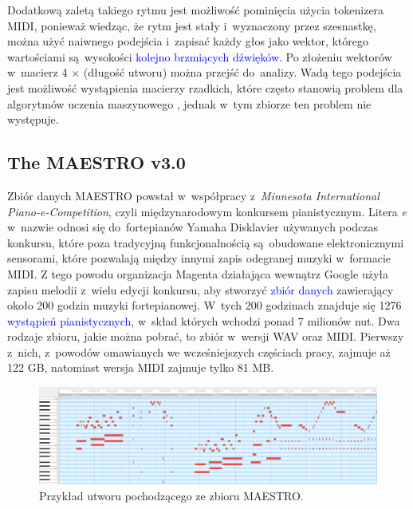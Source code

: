 \documentclass[data-science]{agh-wi} %
\begin{document}
Dodatkową zaletą takiego rytmu jest możliwość pominięcia użycia tokenizera MIDI, ponieważ wiedząc, że rytm jest stały i~wyznaczony przez szesnastkę, można użyć naiwnego podejścia i~zapisać każdy głos jako wektor, którego wartościami są~wysokości \textcolor{blue}{kolejno brzmiących dźwięków.} Po złożeniu wektorów w~macierz 4 $\times$ (długość utworu) można przejść do~analizy. Wadą tego podejścia jest możliwość wystąpienia macierzy rzadkich, które często stanowią problem dla algorytmów uczenia maszynowego \cite*{sparse_matrix}, jednak w~tym zbiorze ten problem nie występuje.

\subsection{The MAESTRO v3.0}
Zbiór danych MAESTRO \cite{maestrov3} powstał w~współpracy z~\textit{Minnesota International Piano-e-Competition}, czyli międzynarodowym konkursem pianistycznym. Litera \textit{e} w~nazwie odnosi się do~fortepianów Yamaha Disklavier używanych podczas konkursu, które poza tradycyjną funkcjonalnością są~obudowane elektronicznymi sensorami, które pozwalają między innymi zapis odegranej muzyki w~formacie MIDI. Z tego powodu organizacja Magenta działająca wewnątrz Google użyła zapisu melodii z~wielu edycji konkursu, aby stworzyć \textcolor{blue}{zbiór danych} zawierający około 200 godzin muzyki fortepianowej. W~tych 200 godzinach znajduje się 1276 \textcolor{blue}{wystąpień pianistycznych}, w~skład których wchodzi ponad 7 milionów nut. Dwa rodzaje zbioru, jakie można pobrać, to zbiór w~wersji WAV oraz MIDI. Pierwszy z~nich, z~powodów omawianych we wcześniejszych częściach pracy, zajmuje aż 122 GB, natomiast wersja MIDI zajmuje tylko 81 MB.
\begin{figure}[ht!]
    \begin{center}
        \includegraphics[width=0.9\linewidth]{./img/maestro_1.png}
    \end{center}
    \caption{{Przykład utworu pochodzącego ze zbioru MAESTRO.}}\label{fig:maestro_midi}
\end{figure}
\end{document}
